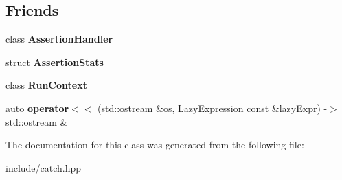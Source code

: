 \subsection*{Friends}
\begin{DoxyCompactItemize}
\item 
class {\bfseries Assertion\+Handler}\hypertarget{classCatch_1_1LazyExpression_a4301a3aa57b612dd8b6ef8461742ecab}{}\label{classCatch_1_1LazyExpression_a4301a3aa57b612dd8b6ef8461742ecab}

\item 
struct {\bfseries Assertion\+Stats}\hypertarget{classCatch_1_1LazyExpression_a64019eb137f5ce447cdc71cb80b6e7a4}{}\label{classCatch_1_1LazyExpression_a64019eb137f5ce447cdc71cb80b6e7a4}

\item 
class {\bfseries Run\+Context}\hypertarget{classCatch_1_1LazyExpression_af3aa096bb29a772bc534830f29a2ce7a}{}\label{classCatch_1_1LazyExpression_af3aa096bb29a772bc534830f29a2ce7a}

\item 
auto {\bfseries operator$<$$<$} (std\+::ostream \&os, \hyperlink{classCatch_1_1LazyExpression}{Lazy\+Expression} const \&lazy\+Expr) -\/$>$ std\+::ostream \&\hypertarget{classCatch_1_1LazyExpression_aa01086581cab2fcd2d4580b8fa787dfc}{}\label{classCatch_1_1LazyExpression_aa01086581cab2fcd2d4580b8fa787dfc}

\end{DoxyCompactItemize}


The documentation for this class was generated from the following file\+:\begin{DoxyCompactItemize}
\item 
include/catch.\+hpp\end{DoxyCompactItemize}
